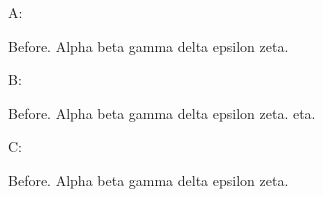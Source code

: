\documentclass{article}
\begin{document}
\teudotlegend

A: \begin{teudot}
Before.  Alpha beta  gamma delta  epsilon zeta.
\end{teudot}

B: \begin{teudot}[show=e, others=omit]
Before.  Alpha beta  gamma delta  epsilon zeta.  eta.
\end{teudot}

C: \begin{teudot}[show=e, others=ghost]
Before.  Alpha beta  gamma delta  epsilon zeta.
\end{teudot}
\end{document}

